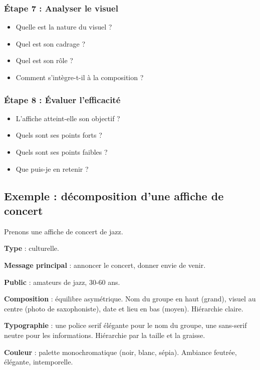 \subsubsection{Étape 7 : Analyser le visuel}

\begin{itemize}
    \item Quelle est la nature du visuel ?
    \item Quel est son cadrage ?
    \item Quel est son rôle ?
    \item Comment s'intègre-t-il à la composition ?
\end{itemize}

\subsubsection{Étape 8 : Évaluer l'efficacité}

\begin{itemize}
    \item L'affiche atteint-elle son objectif ?
    \item Quels sont ses points forts ?
    \item Quels sont ses points faibles ?
    \item Que puis-je en retenir ?
\end{itemize}

\subsection{Exemple : décomposition d'une affiche de concert}

Prenons une affiche de concert de jazz.

\textbf{Type} : culturelle.

\textbf{Message principal} : annoncer le concert, donner envie de venir.

\textbf{Public} : amateurs de jazz, 30-60 ans.

\textbf{Composition} : équilibre asymétrique. Nom du groupe en haut (grand), visuel au centre (photo de saxophoniste), date et lieu en bas (moyen). Hiérarchie claire.

\textbf{Typographie} : une police serif élégante pour le nom du groupe, une sans-serif neutre pour les informations. Hiérarchie par la taille et la graisse.

\textbf{Couleur} : palette monochromatique (noir, blanc, sépia). Ambiance feutrée, élégante, intemporelle.

